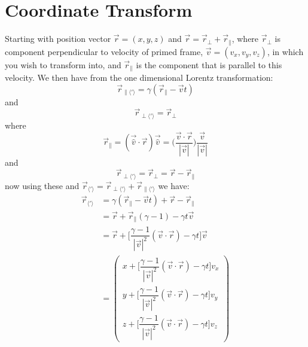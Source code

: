 \section{Coordinate Transform}

Starting with position vector $\vec{r} = (x,y,z)$ and $\vec{r} = \vec{r}_{\perp} + \vec{r}_{\parallel}$, where $\vec{r}_{\perp}$ is component perpendicular to velocity of primed frame, $\vec{v}= (v_x,v_y,v_z)$, in which you wish to transform into, and $\vec{r}_{\parallel}$ is the component that is parallel to this velocity. We then have from the one dimensional Lorentz transformation:
\begin{equation}%
    \vec{r}_{\parallel \langle ' \rangle}  = \gamma (\vec{r}_{\parallel}-\vec{v}t)
\end{equation}%
and
\begin{equation}%
    \vec{r}_{\perp \langle ' \rangle}  = \vec{r}_{\perp}
\end{equation}%
where
\begin{equation}%
    \vec{r}_{\parallel}= \left( \vec{\hat{v}}\cdot\vec{r}\right)\vec{\hat{v}} =  \bigg(\dfrac{\vec{v}\cdot\vec{r}}{|\vec{v}|}\bigg)\dfrac{\vec{v}}{|\vec{v}|}
\end{equation}%
and
\begin{equation}%
    \vec{r}_{\perp \langle ' \rangle} = \vec{r}_{\perp}= \vec{r} - \vec{r}_{\parallel}
\end{equation}%
now using these and $\vec{r}_{\langle ' \rangle}  = \vec{r}_{\perp \langle ' \rangle}  + \vec{r}_{\parallel \langle ' \rangle} $ we have:
\begin{equation}%
    \begin{split}
    \vec{r}_{\langle ' \rangle}  &= \gamma (\vec{r}_{\parallel}-\vec{v}t) + \vec{r} - \vec{r}_{\parallel} \\
    &= \vec{r} + \vec{r}_{\parallel}(\gamma-1) - \gamma t \vec{v} \\
    &= \vec{r} + \Big[ \dfrac{\gamma-1}{|\vec{v}|^2}(\vec{v}\cdot\vec{r})- \gamma t\Big]\vec{v}\\
    &= \begin{pmatrix}
    x + \Big[ \dfrac{\gamma-1}{|\vec{v}|^2}(\vec{v}\cdot\vec{r})- \gamma t\Big] v_x\\
    y + \Big[ \dfrac{\gamma-1}{|\vec{v}|^2}(\vec{v}\cdot\vec{r})- \gamma t\Big] v_y\\
    z + \Big[ \dfrac{\gamma-1}{|\vec{v}|^2}(\vec{v}\cdot\vec{r})- \gamma t\Big] v_z
    \end{pmatrix}
    \end{split}
\end{equation}%
